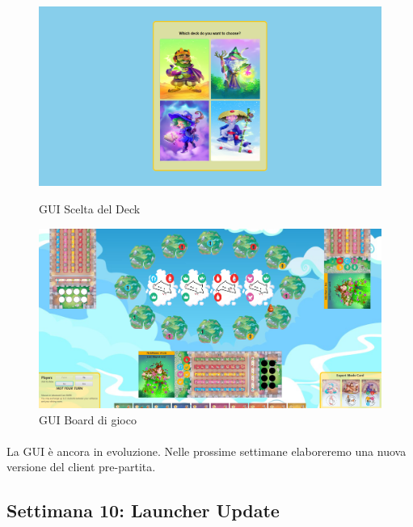 \documentclass[a4paper, 12pt]{article}
\begin{document}
	\begin{figure}[!htb]
		\begin{minipage}{0.495\textwidth}
			\centering
			\includegraphics[width=\linewidth]{gui2Week9.png}
			\caption{GUI Scelta del Deck}
		\end{minipage}\hfill
		\begin{minipage}{0.495\textwidth}
			\centering
			\includegraphics[width=\linewidth]{guiWeek9.png}
			\caption{GUI Board di gioco}
		\end{minipage}
	\end{figure}
	\paragraph{}
	La GUI è ancora in evoluzione. Nelle prossime settimane elaboreremo una nuova versione del client pre-partita.
	
	\newpage
	\subsection{Settimana 10: Launcher Update}
\end{document}
